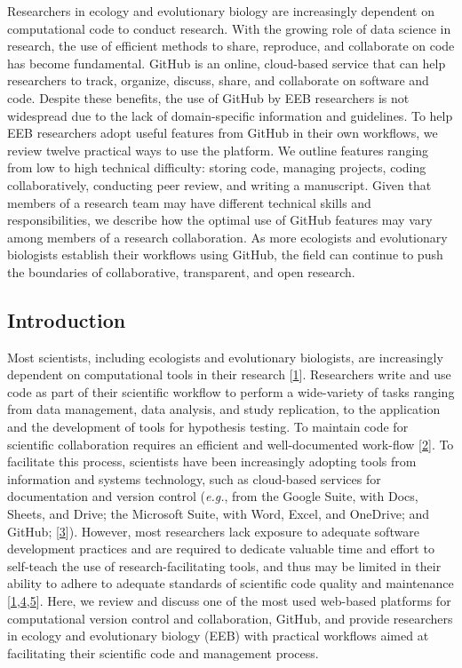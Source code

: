 Researchers in ecology and evolutionary biology are increasingly dependent on computational code to conduct research.
With the growing role of data science in research, the use of efficient methods to share, reproduce, and collaborate on code has become fundamental.
GitHub is an online, cloud-based service that can help researchers to track, organize, discuss, share, and collaborate on software and code.
Despite these benefits, the use of GitHub by EEB researchers is not widespread due to the lack of domain-specific information and guidelines.
To help EEB researchers adopt useful features from GitHub in their own workflows, we review twelve practical ways to use the platform.
We outline features ranging from low to high technical difficulty: storing code, managing projects, coding collaboratively, conducting peer review, and writing a manuscript.
Given that members of a research team may have different technical skills and responsibilities, we describe how the optimal use of GitHub features may vary among members of a research collaboration.
As more ecologists and evolutionary biologists establish their workflows using GitHub, the field can continue to push the boundaries of collaborative, transparent, and open research.

\hypertarget{introduction}{%
\subsection{Introduction}\label{introduction}}

Most scientists, including ecologists and evolutionary biologists, are increasingly dependent on computational tools in their research {[}\protect\hyperlink{ref-fJWFe93e}{1}{]}.
Researchers write and use code as part of their scientific workflow to perform a wide-variety of tasks ranging from data management, data analysis, and study replication, to the application and the development of tools for hypothesis testing.
To maintain code for scientific collaboration requires an efficient and well-documented work-flow {[}\protect\hyperlink{ref-1Kqna6l2}{2}{]}.
To facilitate this process, scientists have been increasingly adopting tools from information and systems technology, such as cloud-based services for documentation and version control (\emph{e.g.}, from the Google Suite, with Docs, Sheets, and Drive; the Microsoft Suite, with Word, Excel, and OneDrive; and GitHub; {[}\protect\hyperlink{ref-10ghgV3S8}{3}{]}).
However, most researchers lack exposure to adequate software development practices and are required to dedicate valuable time and effort to self-teach the use of research-facilitating tools, and thus may be limited in their ability to adhere to adequate standards of scientific code quality and maintenance {[}\protect\hyperlink{ref-fJWFe93e}{1},\protect\hyperlink{ref-10SpoByIw}{4},\protect\hyperlink{ref-O6UbstGG}{5}{]}.
Here, we review and discuss one of the most used web-based platforms for computational version control and collaboration, GitHub, and provide researchers in ecology and evolutionary biology (EEB) with practical workflows aimed at facilitating their scientific code and management process.

